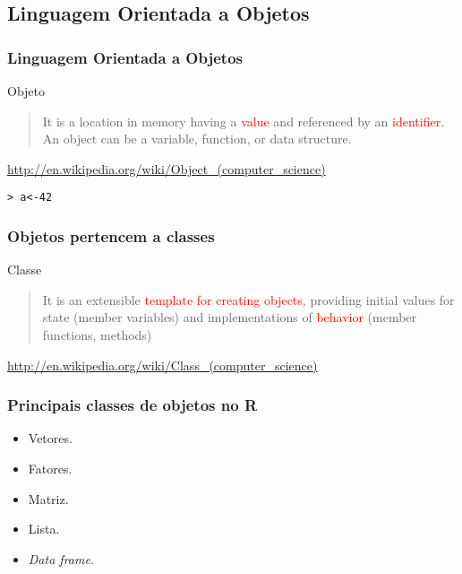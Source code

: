 \documentclass{beamer}
\begin{document}
\subsection{Linguagem Orientada a Objetos}

\begin{frame}
  \frametitle{Linguagem Orientada a Objetos}
  \begin{block}{Objeto}
    \begin{quote}
      It is a location in memory having a \textcolor{red}{value} and referenced by an \textcolor{red}{identifier}. An object can be a variable, function, or data structure.
      \end{quote}
\url{http://en.wikipedia.org/wiki/Object_(computer_science)} 
\end{block}
\pause
\texttt{> a<-42}
\end{frame}

\begin{frame}
  \frametitle{Objetos pertencem a classes}
  \begin{block}{Classe}
    \begin{quote}
      It is an extensible \textcolor{red}{template for creating
        objects}, providing initial values for state (member
      variables) and implementations of \textcolor{red}{behavior} (member functions, methods)
    \end{quote}
\url{http://en.wikipedia.org/wiki/Class_(computer_science)}

  \end{block}
\end{frame}

\begin{frame}
  \frametitle{Principais classes de objetos no R}
  \begin{itemize}
    \item Vetores.
    \item Fatores.
    \item Matriz.
    \item Lista.
    \item \textit{Data frame}.
    
  \end{itemize}
  \end{frame}
\end{document}

